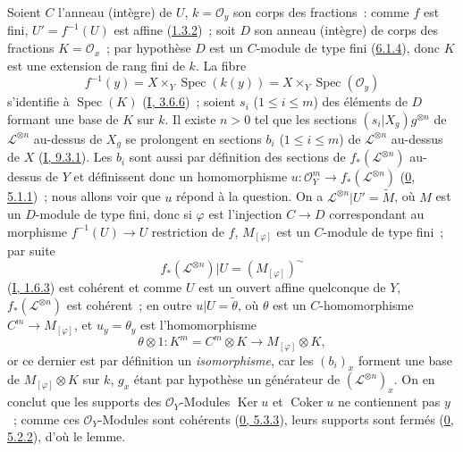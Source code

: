 Soient $C$ l'anneau (intègre) de $U$, $k=\mathcal{O}_y$ son corps des
fractions~: comme $f$ est fini, $U'=f^{-1}(U)$ est affine
(\hyperref[II.1.3.2-fr]{1.3.2})~; soit $D$ son anneau (intègre) de corps des
fractions $K=\mathcal{O}_x$~; par hypothèse $D$ est un $C$-module de type
fini (\hyperref[II.6.1.4-fr]{6.1.4}), donc $K$ est une extension de rang fini
de $k$. La fibre
\[
f^{-1}(y)=X\times_Y\operatorname{Spec}(k(y))
=X\times_Y\operatorname{Spec}(\mathcal{O}_y)
\]
s'identifie à $\operatorname{Spec}(K)$
(\hyperref[I.3.6.5-fr]{I, 3.6.6})~; soient $s_i$ ($1\leq i\leq m$) des
éléments de $D$ formant une base de $K$ sur $k$. Il existe $n>0$ tel que les
sections $(s_i|X_g)g^{\otimes n}$ de $\mathcal{L}^{\otimes n}$ au-dessus de
$X_g$ se prolongent en sections $b_i$ ($1\leq i\leq m$) de
$\mathcal{L}^{\otimes n}$ au-dessus de $X$
(\hyperref[I.9.3.1-fr]{I, 9.3.1}). Les $b_i$ sont aussi par définition des
sections de $f_*(\mathcal{L}^{\otimes n})$ au-dessus de $Y$ et définissent
donc un homomorphisme
$u:\mathcal{O}_Y^m\to f_*(\mathcal{L}^{\otimes n})$
(\hyperref[0.5.1.1-fr]{0, 5.1.1})~; nous allons voir que $u$ répond à la
question. On a $\mathcal{L}^{\otimes n}|U'=\widetilde{M}$, où $M$ est un
$D$-module de type fini, donc si $\varphi$ est l'injection $C\to D$
correspondant au morphisme $f^{-1}(U)\to U$ restriction de $f$,
$M_{[\varphi]}$ est un $C$-module de type fini~; par suite
\[
f_*(\mathcal{L}^{\otimes n})|U=(M_{[\varphi]})^\sim
\]
(\hyperref[I.1.6.3-fr]{I, 1.6.3}) est cohérent et comme $U$ est un ouvert
affine quelconque de $Y$, $f_*(\mathcal{L}^{\otimes n})$ est cohérent~; en
outre $u|U=\widetilde{\theta}$, où $\theta$ est un $C$-homomorphisme
$C^m\to M_{[\varphi]}$, et $u_y=\theta_y$ est l'homomorphisme
\[
\theta\otimes1:K^m=C^m\otimes K\longrightarrow
M_{[\varphi]}\otimes K,
\]
or ce dernier est par définition un \emph{isomorphisme}, car les $(b_i)_x$
forment une base de $M_{[\varphi]}\otimes K$ sur $k$, $g_x$ étant par
hypothèse un générateur de $(\mathcal{L}^{\otimes n})_x$. On en conclut que
les supports des $\mathcal{O}_Y$-Modules $\operatorname{Ker}u$ et
$\operatorname{Coker}u$ ne contiennent pas $y$~; comme ces
$\mathcal{O}_Y$-Modules sont cohérents
(\hyperref[0.5.3.3-fr]{0, 5.3.3}), leurs supports sont fermés
(\hyperref[0.5.2.2-fr]{0, 5.2.2}), d'où le lemme.


